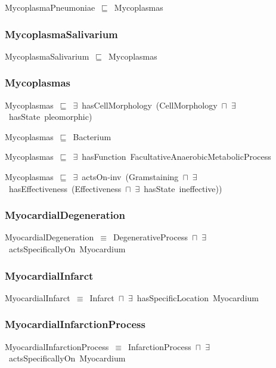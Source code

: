\documentclass{article}
\begin{document}
MycoplasmaPneumoniae~\ensuremath{\sqsubseteq}~Mycoplasmas~

\subsubsection*{MycoplasmaSalivarium}

MycoplasmaSalivarium~\ensuremath{\sqsubseteq}~Mycoplasmas~

\subsubsection*{Mycoplasmas}

Mycoplasmas~\ensuremath{\sqsubseteq}~\ensuremath{\exists}~hasCellMorphology~(CellMorphology~\ensuremath{\sqcap}~\ensuremath{\exists}~hasState~pleomorphic)~

Mycoplasmas~\ensuremath{\sqsubseteq}~Bacterium~

Mycoplasmas~\ensuremath{\sqsubseteq}~\ensuremath{\exists}~hasFunction~FacultativeAnaerobicMetabolicProcess~

Mycoplasmas~\ensuremath{\sqsubseteq}~\ensuremath{\exists}~actsOn-inv~(Gramstaining~\ensuremath{\sqcap}~\ensuremath{\exists}~hasEffectiveness~(Effectiveness~\ensuremath{\sqcap}~\ensuremath{\exists}~hasState~ineffective))~

\subsubsection*{MyocardialDegeneration}

MyocardialDegeneration~\ensuremath{\equiv}~DegenerativeProcess~\ensuremath{\sqcap}~\ensuremath{\exists}~actsSpecificallyOn~Myocardium

\subsubsection*{MyocardialInfarct}

MyocardialInfarct~\ensuremath{\equiv}~Infarct~\ensuremath{\sqcap}~\ensuremath{\exists}~hasSpecificLocation~Myocardium

\subsubsection*{MyocardialInfarctionProcess}

MyocardialInfarctionProcess~\ensuremath{\equiv}~InfarctionProcess~\ensuremath{\sqcap}~\ensuremath{\exists}~actsSpecificallyOn~Myocardium
\end{document}
